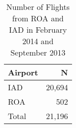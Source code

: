 \begin{table}[!htbp]
\centering
\caption{Number of Flights from ROA and IAD in February 2014 and September 2013} 
\label{tab:nflights}
\begin{tabular}{lr}
  \toprule
Airport & N \\ 
  \midrule
IAD & 20,694 \\ 
  ROA &    502 \\ 
  Total & 21,196 \\ 
   \bottomrule
\end{tabular}
\end{table}
